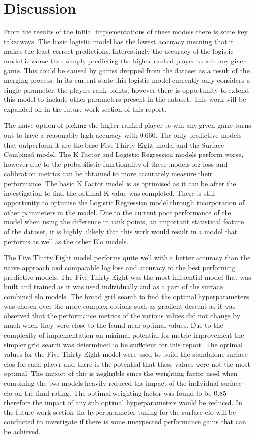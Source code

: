 \documentclass[12pt,a4paper]{article}
\begin{document}
\clearpage
\section{Discussion}
From the results of the initial implementations of these models there is some key
takeaways. The basic logistic model has the lowest accuracy meaning that it
makes the least correct predictions. Interestingly the accuracy of the logistic model is
worse than simply predicting the higher ranked player to win any given game. This could be
caused by games dropped from the dataset as a result of the merging process.
In its current state this logistic model currently only
considers a single parameter, the players rank points, however there is opportunity to
extend this model to include other parameters present in the dataset. This work will be expanded
on in the future work section of this report.

The naive option of picking the higher ranked player to win any given game turns out to have
a reasonably high accuracy with 0.660. The only predictive models that outperform it are the base
Five Thirty Eight model and the Surface Combined model. The K Factor and Logistic Regression models
perform worse, however due to the probabilistic functionality of these models log loss and calibration
metrics can be obtained to more accurately measure their performance. The basic K Factor model
is as optimised as it can be after the investigation to find the optimal K value was completed.
There is still opportunity to optimise the Logistic Regression model through incorporation of
other parameters in the model. Due to the current poor performance of the model when using
the difference in rank points, an important statistical feature of the dataset, it is highly ulikely
that this work would result in a model that performs as well as the other Elo models.

The Five Thirty Eight model performs quite well with a better accuracy than the naive approach and
comparable log loss and accuracy to the best performing predictive models. The Five Thirty Eight
was the most influential model that was built and trained as it was used individually and as a
part of the surface combined elo models. The broad grid search to find the optimal hyperparameters
was chosen over the more complex options such as gradient descent as it was observed that the
performance metrics of the various values did not change by much when they were close to the found
near optimal values. Due to the complexity of implementation on minimal potential for metric
improvement the simpler grid search was determined to be sufficient for this report. The optimal
values for the Five Thirty Eight model were used to build the standalone surface elos for each
player and there is the potential that these values were not the most optimal. The impact of this
is negligible since the weighting factor used when combining the two models heavily reduced the impact
of the individual surface elo on the final rating. The optimal weighting factor was found to be 0.85
therefore the impact of any sub optimal hyperparameters would be reduced. In the future work
section the hyperparameter tuning for the surface elo will be conducted to investigate if there is
some unexpected performance gains that can be achieved.
\end{document}
